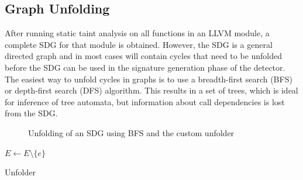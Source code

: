 \subsection{Graph Unfolding}
After running static taint analysis on all functions in an \textsc{LLVM} module, a complete SDG for that module is obtained. However, the \textsc{SDG} is a general directed graph and in most cases will contain cycles that need to be unfolded before the \textsc{SDG} can be used in the signature generation phase of the detector. The easiest way to unfold cycles in graphs is to use a breadth-first search (\textsc{BFS}) or depth-first search (\textsc{DFS}) algorithm. This results in a set of trees, which is ideal for inference of tree automata, but information about call dependencies is lost from the \textsc{SDG}.

\begin{figure}[H]
    \centering
    \caption{Unfolding of an SDG using BFS and the custom unfolder}
    \label{fig_unfold}
\end{figure}

\begin{algorithm}[H]
\BlankLine
{}
$E \leftarrow E \setminus \{e\}$\;
\caption{Unfolder}
\label{alg_unfolder}
\end{algorithm}

